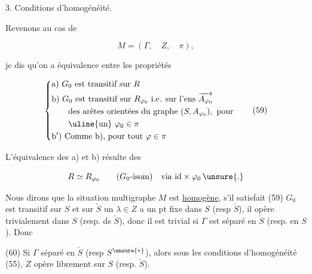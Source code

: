 
3. Conditions d'homogénéité.

 Revenons au cas de  \deleted{\unsure{$\Gamma$}}


\[
M=(\Gamma,\quad Z,\quad\pi),
\]

je dis qu'on a équivalence entre les propriétés

\[
\left\{\begin{aligned}
&\text{a) }G_0\text{ est transitif sur }R\\
&\text{b) }G_0\text{ est transitif sur }R_{\varphi_0}\ \text{i.e. sur l'ens }\overrightarrow{A_{\varphi_0}}\\
&\qquad\text{des arêtes orientées du graphe }(S,A_{\varphi_0}),\ \text{pour}\\
&\qquad\text{\uline{un} }\varphi_0\in\pi\\
&\text{b$'$) Comme b), pour tout }\varphi\in\pi
\end{aligned}\right.
\tag*{(59)}
\]


L'équivalence des a) et b)  résulte des 

\[
R\simeq R_{\varphi_0}\qquad(G_0\text{-isom})\quad\text{via }\mathrm{id}\times\varphi_0\,\unsure{.}
\]

  Nous dirons que la situation  multigraphe $M$ est \uline{homogène}, s'il satisfait (59)    $G_0$ est transitif sur $S$ et sur $\check S$     un $\lambda\in Z$  a un pt fixe dans $S$ (resp $\check S$), il opère trivialement dans $S$ (resp. ds $\check S$), donc il est trivial si $\Gamma$ est séparé en $\check S$ (resp. en $S$). Donc

(60) Si $\Gamma$ séparé en $\check S$ (resp $S^{\unsure{*}}$), alors sous les conditions d'homogénéité (55), $Z$ opère librement sur $S$ (resp. $\check S$).

